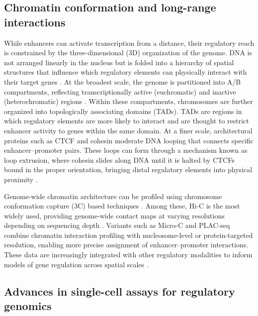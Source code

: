 \begin{dissertationintroduction}
\subsection{Chromatin conformation and long-range interactions}

While enhancers can activate transcription from a distance, their regulatory reach is constrained by the three-dimensional (3D) organization of the genome. DNA is not arranged linearly in the nucleus but is folded into a hierarchy of spatial structures that influence which regulatory elements can physically interact with their target genes \cite{Zheng2019-ld}. At the broadest scale, the genome is partitioned into A/B compartments, reflecting transcriptionally active (euchromatic) and inactive (heterochromatic) regions \cite{Dixon2012-rp}. Within these compartments, chromosomes are further organized into topologically associating domains (TADs). TADs are regions in which regulatory elements are more likely to interact \cite{Rodriguez-Carballo2017-lh} and are thought to restrict enhancer activity to genes within the same domain. At a finer scale, architectural proteins such as CTCF and cohesin \cite{Merkenschlager2016-hx} moderate DNA looping that connects specific enhancer–promoter pairs. These loops can form through a mechanism known as loop extrusion, where cohesin slides along DNA until it is halted by CTCFs bound in the proper orientation, bringing distal regulatory elements into physical proximity \cite{Fudenberg2017-wd}.

Genome-wide chromatin architecture can be profiled using chromosome conformation capture (3C) based techniques \cite{Lieberman-Aiden2009-tc}. Among these, Hi-C is the most widely used, providing genome-wide contact maps at varying resolutions depending on sequencing depth \cite{Belton2012-yi}. Variants such as Micro-C \cite{Hsieh2015-ao} and PLAC-seq \cite{Yu2021-nv} combine chromatin interaction profiling with nucleosome-level or protein-targeted resolution, enabling more precise assignment of enhancer–promoter interactions. These data are increasingly integrated with other regulatory modalities to inform models of gene regulation across spatial scales \cite{Pal2019-so}.

\subsection{Advances in single-cell assays for regulatory genomics}


\end{dissertationintroduction}
